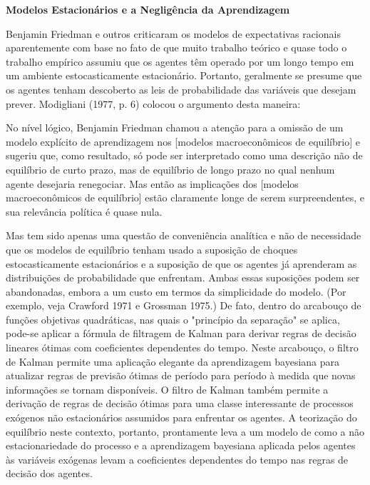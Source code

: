 \documentclass[a4paper,12pt]{article}[abntex2]
\begin{document}
\textbf{Modelos Estacionários e a Negligência da Aprendizagem}

Benjamin Friedman e outros criticaram os modelos de expectativas racionais aparentemente com base no fato de que muito trabalho teórico e quase todo o trabalho empírico assumiu que os agentes têm operado por um longo tempo em um ambiente estocasticamente estacionário. Portanto, geralmente se presume que os agentes tenham descoberto as leis de probabilidade das variáveis que desejam prever. Modigliani (1977, p. 6) colocou o argumento desta maneira:

No nível lógico, Benjamin Friedman chamou a atenção para a omissão de um modelo explícito de aprendizagem nos [modelos macroeconômicos de equilíbrio] e sugeriu que, como resultado, só pode ser interpretado como uma descrição não de equilíbrio de curto prazo, mas de equilíbrio de longo prazo no qual nenhum agente desejaria renegociar. Mas então as implicações dos [modelos macroeconômicos de equilíbrio] estão claramente longe de serem surpreendentes, e sua relevância política é quase nula.

Mas tem sido apenas uma questão de conveniência analítica e não de necessidade que os modelos de equilíbrio tenham usado a suposição de choques estocasticamente estacionários e a suposição de que os agentes já aprenderam as distribuições de probabilidade que enfrentam. Ambas essas suposições podem ser abandonadas, embora a um custo em termos da simplicidade do modelo. (Por exemplo, veja Crawford 1971 e Grossman 1975.) De fato, dentro do arcabouço de funções objetivas quadráticas, nas quais o "princípio da separação" se aplica, pode-se aplicar a fórmula de filtragem de Kalman para derivar regras de decisão lineares ótimas com coeficientes dependentes do tempo. Neste arcabouço, o filtro de Kalman permite uma aplicação elegante da aprendizagem bayesiana para atualizar regras de previsão ótimas de período para período à medida que novas informações se tornam disponíveis. O filtro de Kalman também permite a derivação de regras de decisão ótimas para uma classe interessante de processos exógenos não estacionários assumidos para enfrentar os agentes. A teorização do equilíbrio neste contexto, portanto, prontamente leva a um modelo de como a não estacionariedade do processo e a aprendizagem bayesiana aplicada pelos agentes às variáveis exógenas levam a coeficientes dependentes do tempo nas regras de decisão dos agentes.
\end{document}

